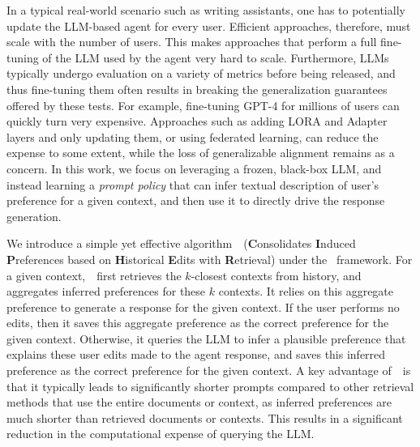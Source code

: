 In a typical real-world scenario such as writing assistants, one has to potentially update the LLM-based agent for every user. Efficient approaches, therefore, must scale with the number of users. This makes approaches that perform a full fine-tuning of the LLM used by the agent very hard to scale. Furthermore, LLMs typically undergo evaluation on a variety of metrics before being released, and thus fine-tuning them often results in breaking the generalization guarantees offered by these tests. For example, fine-tuning GPT-4 for millions of users can quickly turn very expensive. Approaches such as adding LORA and Adapter layers and only updating them, or using federated learning, can reduce the expense to some extent, while the loss of generalizable alignment remains as a concern. In this work, we focus on leveraging a frozen, black-box LLM, and instead learning a \emph{prompt policy} that can infer textual description of user's preference for a given context, and then use it to directly drive the response generation.

We introduce a simple yet effective algorithm~\textbf{\algname}~(\textbf{C}onsolidates \textbf{I}nduced \textbf{P}references based on \textbf{H}istorical \textbf{E}dits with \textbf{R}etrieval) under the \framework~framework. For a given context,~\algname~first retrieves the $k$-closest contexts from history, and aggregates inferred preferences for these $k$ contexts. It relies on this aggregate preference to generate a response for the given context. If the user performs no edits, then it saves this aggregate preference as the correct preference for the given context. Otherwise, it queries the LLM to infer a plausible preference that explains these user edits made to the agent response, and saves this inferred preference as the correct preference for the given context. A key advantage of~\algname~is that it typically leads to significantly shorter prompts compared to other retrieval methods that use the entire documents or context, as inferred preferences are much shorter than retrieved documents or contexts. This results in a significant reduction in the computational expense of querying the LLM.

